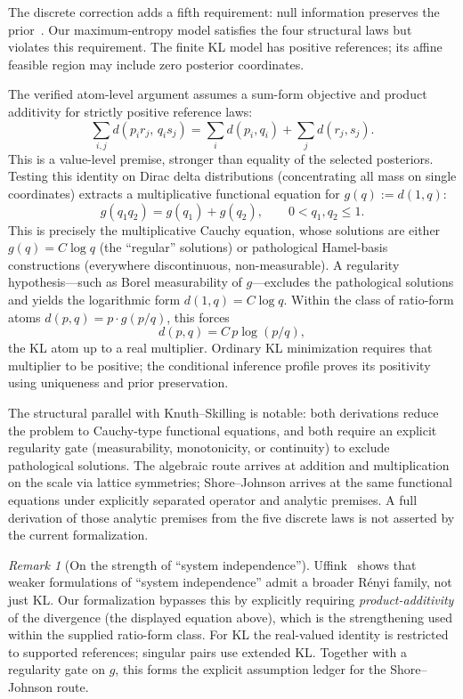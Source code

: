 \documentclass[11pt]{article}
\theoremstyle{definition}
\theoremstyle{remark}
\newtheorem{remark}[theorem]{Remark}
\begin{document}
The discrete correction adds a fifth requirement: null information preserves the
prior~\cite{JohnsonShore1983}. Our maximum-entropy model satisfies the four structural
laws but violates this requirement. The finite KL model has positive references;
its affine feasible region may include zero posterior coordinates.

The verified atom-level argument assumes a sum-form objective and product additivity
for strictly positive reference laws:
\[
  \sum_{i,j} d(p_i r_j,\, q_i s_j) = \sum_i d(p_i,q_i) + \sum_j d(r_j,s_j).
\]
This is a value-level premise, stronger than equality of the selected posteriors.
Testing this identity on Dirac delta distributions (concentrating all mass on single coordinates)
extracts a multiplicative functional equation for $g(q) := d(1,q)$:
\[
  g(q_1 q_2) = g(q_1) + g(q_2), \qquad 0 < q_1,q_2 \le 1.
\]
This is precisely the multiplicative Cauchy equation, whose solutions are either $g(q)=C\log q$
(the ``regular'' solutions) or pathological Hamel-basis constructions (everywhere discontinuous,
non-measurable).  A regularity hypothesis---such as Borel measurability of $g$---excludes the
pathological solutions and yields the logarithmic form $d(1,q)=C\log q$.  Within the class of
ratio-form atoms $d(p,q)=p\cdot g(p/q)$, this forces
\[
  d(p,q) = C\, p\log(p/q),
\]
the KL atom up to a real multiplier. Ordinary KL minimization requires that
multiplier to be positive; the conditional inference profile proves its positivity
using uniqueness and prior preservation.

The structural parallel with Knuth--Skilling is notable: both derivations reduce the problem to
Cauchy-type functional equations, and both require an explicit regularity gate (measurability,
monotonicity, or continuity) to exclude pathological solutions.  The algebraic route arrives at
addition and multiplication on the scale via lattice symmetries; Shore--Johnson arrives at the
same functional equations under explicitly separated operator and analytic
premises. A full derivation of those analytic premises from the five discrete laws
is not asserted by the current formalization.

\begin{remark}[On the strength of ``system independence'']
Uffink~\cite{Uffink1995} shows that weaker formulations of ``system independence'' admit a broader
R\'enyi family, not just KL.  Our formalization bypasses this by explicitly requiring
\emph{product-additivity} of the divergence (the displayed equation above), which is the
strengthening used within the supplied ratio-form class. For KL the real-valued
identity is restricted to supported references; singular pairs use extended KL.
Together with a regularity gate on $g$, this forms the
explicit assumption ledger for the Shore--Johnson route.
\end{remark}
\end{document}
